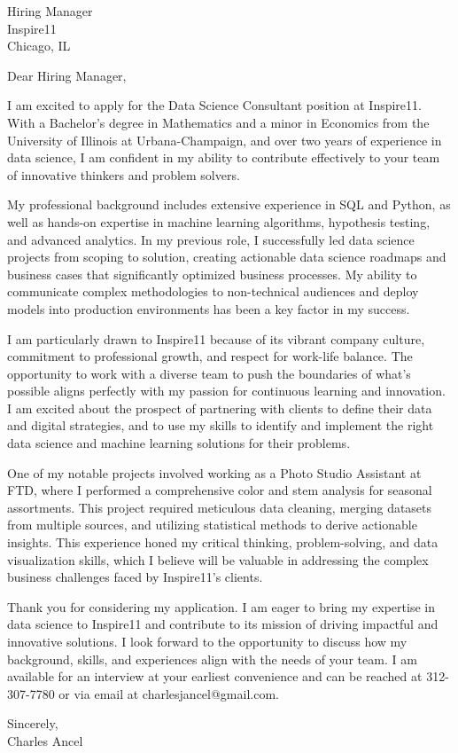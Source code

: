 \documentclass{letter}
\begin{document}
\begin{letter}{Hiring Manager\\Inspire11\\Chicago, IL}

\opening{Dear Hiring Manager,}

I am excited to apply for the Data Science Consultant position at Inspire11. With a Bachelor's degree in Mathematics and a minor in Economics from the University of Illinois at Urbana-Champaign, and over two years of experience in data science, I am confident in my ability to contribute effectively to your team of innovative thinkers and problem solvers.

My professional background includes extensive experience in SQL and Python, as well as hands-on expertise in machine learning algorithms, hypothesis testing, and advanced analytics. In my previous role, I successfully led data science projects from scoping to solution, creating actionable data science roadmaps and business cases that significantly optimized business processes. My ability to communicate complex methodologies to non-technical audiences and deploy models into production environments has been a key factor in my success.

I am particularly drawn to Inspire11 because of its vibrant company culture, commitment to professional growth, and respect for work-life balance. The opportunity to work with a diverse team to push the boundaries of what’s possible aligns perfectly with my passion for continuous learning and innovation. I am excited about the prospect of partnering with clients to define their data and digital strategies, and to use my skills to identify and implement the right data science and machine learning solutions for their problems.

One of my notable projects involved working as a Photo Studio Assistant at FTD, where I performed a comprehensive color and stem analysis for seasonal assortments. This project required meticulous data cleaning, merging datasets from multiple sources, and utilizing statistical methods to derive actionable insights. This experience honed my critical thinking, problem-solving, and data visualization skills, which I believe will be valuable in addressing the complex business challenges faced by Inspire11's clients.

Thank you for considering my application. I am eager to bring my expertise in data science to Inspire11 and contribute to its mission of driving impactful and innovative solutions. I look forward to the opportunity to discuss how my background, skills, and experiences align with the needs of your team. I am available for an interview at your earliest convenience and can be reached at 312-307-7780 or via email at charlesjancel@gmail.com.

\begin{flushleft}
Sincerely,\\
Charles Ancel
\end{flushleft}

\end{letter}
\end{document}
